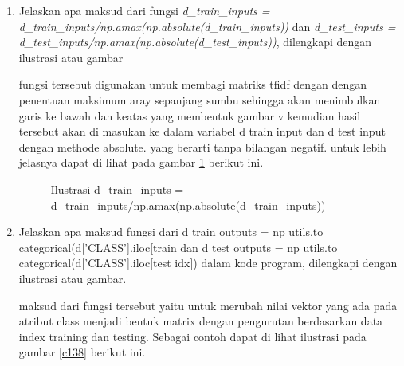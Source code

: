\begin{enumerate}
\item Jelaskan apa maksud dari fungsi \emph{d\_train\_inputs = d\_train\_inputs/np.amax(np.absolute(d\_train\_inputs))} dan \emph{d\_test\_inputs = d\_test\_inputs/np.amax(np.absolute(d\_test\_inputs))}, dilengkapi dengan ilustrasi atau gambar \par

fungsi tersebut digunakan untuk membagi matriks tfidf dengan dengan penentuan maksimum aray sepanjang sumbu sehingga akan menimbulkan garis ke bawah dan keatas yang membentuk gambar v kemudian hasil tersebut akan di masukan ke dalam variabel d train input dan d test input dengan methode absolute. yang berarti tanpa bilangan negatif. untuk lebih jelasnya dapat di lihat pada gambar \ref{c137}  berikut ini.

\begin{figure}[!htbp]
      \caption{Ilustrasi d\_train\_inputs = d\_train\_inputs/np.amax(np.absolute(d\_train\_inputs))}
      \label{c137}
      \end{figure}

\item Jelaskan apa maksud fungsi dari d train outputs = np utils.to categorical(d['CLASS'].iloc[train dan d test outputs = np utils.to categorical(d['CLASS'].iloc[test idx]) dalam kode program, dilengkapi dengan ilustrasi atau gambar.\par

maksud dari fungsi tersebut yaitu untuk merubah nilai vektor yang ada pada atribut class menjadi bentuk matrix dengan pengurutan berdasarkan data index training dan testing. Sebagai contoh dapat di lihat ilustrasi pada gambar \ref{c138} berikut ini.


\end{enumerate}
